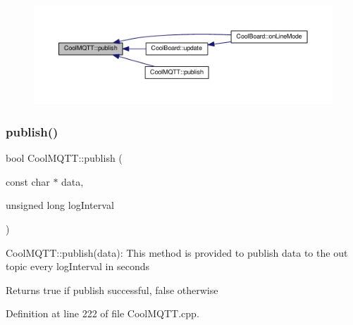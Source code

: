 \begin{figure}[H]
\begin{center}
\leavevmode
\includegraphics[width=350pt]{d0/dd0/class_cool_m_q_t_t_ace977b3e90ab14b1199fe5c4fb0a13ec_icgraph}
\end{center}
\end{figure}
\mbox{\label{class_cool_m_q_t_t_a613c5e3927ae85bb94fbf648d84d8780}} 
\subsubsection{\texorpdfstring{publish()}{publish()}\hspace{0.1cm}{\footnotesize\ttfamily [2/2]}}
{\footnotesize\ttfamily bool Cool\+M\+Q\+T\+T\+::publish (\begin{DoxyParamCaption}\item[{const char $\ast$}]{data,  }\item[{unsigned long}]{log\+Interval }\end{DoxyParamCaption})}

Cool\+M\+Q\+T\+T\+::publish(data)\+: This method is provided to publish data to the out topic every log\+Interval in seconds

\begin{DoxyReturn}{Returns}
true if publish successful, false otherwise 
\end{DoxyReturn}


Definition at line 222 of file Cool\+M\+Q\+T\+T.\+cpp.


